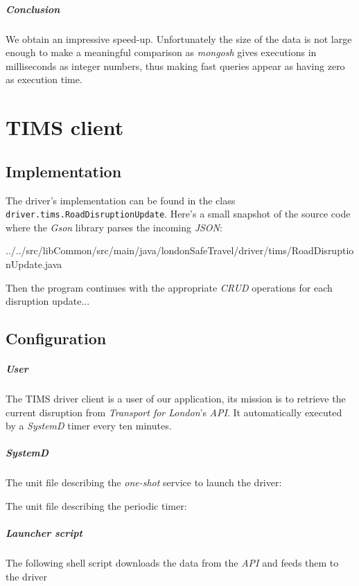 \paragraph{Conclusion}
We obtain an impressive speed-up. Unfortunately the size of the data is not
large enough to make a meaningful comparison as \textit{mongosh} gives
executions in milliseconds as integer numbers, thus making fast queries appear
as having zero as execution time.

\chapter{TIMS client}

\section{Implementation}
The driver's implementation can be found in the class 
\texttt{driver.tims.RoadDisruptionUpdate}. Here's a small snapshot of the 
source code where the \textit{Gson} library parses the incoming \textit{JSON}:


{../../src/libCommon/src/main/java/londonSafeTravel/driver/tims/RoadDisruptionUpdate.java}

Then the program continues with the appropriate \textit{CRUD} operations for 
each disruption update...

\section{Configuration}
\paragraph{User}
The TIMS driver client is a user of our application, its mission is to retrieve 
the current disruption from \textit{Transport for London}'s \textit{API}. It 
automatically executed by a \textit{SystemD} timer every ten minutes.

\paragraph{SystemD}
The unit file describing the \textit{one-shot} service to launch the driver:



The unit file describing the periodic timer:



\paragraph{Launcher script}
The following shell script downloads the data from the \textit{API} and feeds 
them to the driver 


